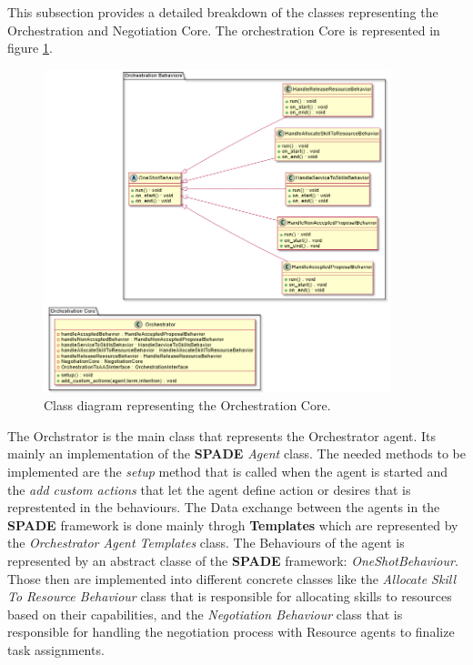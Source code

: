 This subsection provides a detailed breakdown of the classes representing the Orchestration and Negotiation Core.
The orchestration Core is represented in figure \ref{fig:orchestration_core_classes}.
\begin{figure}[ht]
    \centering  
    \includegraphics[width=0.9\textwidth]{Images/Production_Classes/Agent_Core/Orch_Core.png}
    \caption{Class diagram representing the Orchestration Core.}
    \label{fig:orchestration_core_classes}
\end{figure}
The Orchstrator is the main class that represents the Orchestrator agent.
Its mainly an implementation of the \textbf{SPADE} \emph{Agent} class.
The needed methods to be implemented are the \emph{setup} method that is called when the agent is started and the \emph{add custom actions} that let the agent define action or desires that is represtented in the behaviours.
The Data exchange between the agents in the \textbf{SPADE} framework is done mainly throgh \textbf{Templates} which are represented by the \emph{Orchestrator Agent Templates} class.
The Behaviours of the agent is represented by an abstract classe of the \textbf{SPADE} framework: \emph{OneShotBehaviour}.
Those then are implemented into different concrete classes like the \emph{Allocate Skill To Resource Behaviour} class that is responsible for allocating skills to resources based on their capabilities, and the \emph{Negotiation Behaviour} class that is responsible for handling the negotiation process with Resource agents to finalize task assignments.

